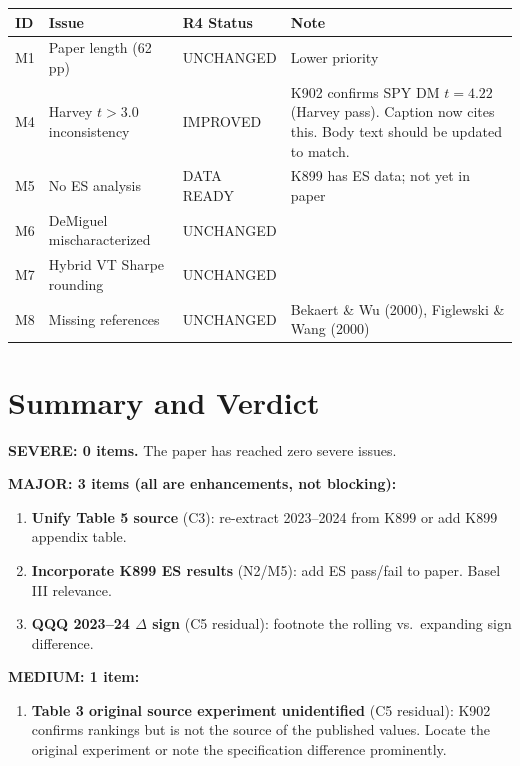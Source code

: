 \documentclass[12pt,a4paper]{article}
\begin{document}
\begin{tabular}{p{1cm}p{5cm}p{2.5cm}p{5.5cm}}
\toprule
\textbf{ID} & \textbf{Issue} & \textbf{R4 Status} & \textbf{Note} \\
\midrule
M1 & Paper length (62 pp) & \textcolor{warncolor}{UNCHANGED} & Lower priority \\
M4 & Harvey $t > 3.0$ inconsistency & \textcolor{resolved}{IMPROVED} & K902 confirms SPY DM $t = 4.22$ (Harvey pass). Caption now cites this. Body text should be updated to match. \\
M5 & No ES analysis & \textcolor{warncolor}{DATA READY} & K899 has ES data; not yet in paper \\
M6 & DeMiguel mischaracterized & \textcolor{warncolor}{UNCHANGED} & \\
M7 & Hybrid VT Sharpe rounding & \textcolor{warncolor}{UNCHANGED} & \\
M8 & Missing references & \textcolor{warncolor}{UNCHANGED} & Bekaert \& Wu (2000), Figlewski \& Wang (2000) \\
\bottomrule
\end{tabular}


\bigskip

\section*{Summary and Verdict}

\textbf{SEVERE: 0 items.} The paper has reached zero severe issues.

\textbf{MAJOR: 3 items (all are enhancements, not blocking):}
\begin{enumerate}
\item \textbf{Unify Table 5 source} (C3): re-extract 2023--2024 from K899 or add K899 appendix table.
\item \textbf{Incorporate K899 ES results} (N2/M5): add ES pass/fail to paper. Basel III relevance.
\item \textbf{QQQ 2023--24 $\Delta$ sign} (C5 residual): footnote the rolling vs.\ expanding sign difference.
\end{enumerate}

\textbf{MEDIUM: 1 item:}
\begin{enumerate}[resume]
\item \textbf{Table 3 original source experiment unidentified} (C5 residual): K902 confirms rankings but is not the source of the published values. Locate the original experiment or note the specification difference prominently.
\end{enumerate}
\end{document}
